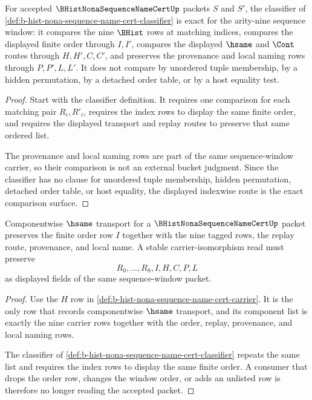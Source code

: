 \begin{theorem}
\label{thm:b-hist-nona-sequence-name-cert-classifier-exactness}
For accepted $\BHistNonaSequenceNameCertUp$ packets $S$ and $S'$, the classifier of \autoref{def:b-hist-nona-sequence-name-cert-classifier} is exact for the arity-nine sequence window: it compares the nine $\BHist$ rows at matching indices, compares the displayed finite order through $I,I'$, compares the displayed $\hsame$ and $\Cont$ routes through $H,H',C,C'$, and preserves the provenance and local naming rows through $P,P',L,L'$. It does not compare by unordered tuple membership, by a hidden permutation, by a detached order table, or by a host equality test.
\end{theorem}
\begin{proof}
Start with the classifier definition. It requires one comparison for each matching pair $R_i,R'_i$, requires the index rows to display the same finite order, and requires the displayed transport and replay routes to preserve that same ordered list.

The provenance and local naming rows are part of the same sequence-window carrier, so their comparison is not an external bucket judgment. Since the classifier has no clause for unordered tuple membership, hidden permutation, detached order table, or host equality, the displayed indexwise route is the exact comparison surface.
\end{proof}

\begin{theorem}
\label{thm:b-hist-nona-sequence-name-cert-index-stability}
Componentwise $\hsame$ transport for a $\BHistNonaSequenceNameCertUp$ packet preserves the finite order row $I$ together with the nine tagged rows, the replay route, provenance, and local name. A stable carrier-isomorphism read must preserve
$$
R_0,\ldots,R_8,I,H,C,P,L
$$
as displayed fields of the same sequence-window packet.
\end{theorem}
\begin{proof}
Use the $H$ row in \autoref{def:b-hist-nona-sequence-name-cert-carrier}. It is the only row that records componentwise $\hsame$ transport, and its component list is exactly the nine carrier rows together with the order, replay, provenance, and local naming rows.

The classifier of \autoref{def:b-hist-nona-sequence-name-cert-classifier} repeats the same list and requires the index rows to display the same finite order. A consumer that drops the order row, changes the window order, or adds an unlisted row is therefore no longer reading the accepted packet.
\end{proof}

